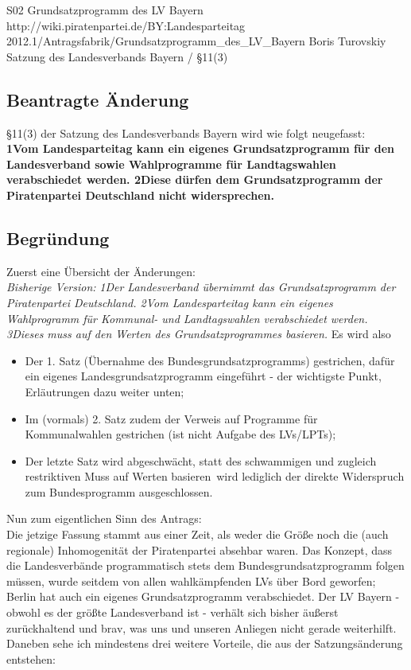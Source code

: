 \anderungsantrag
{S02}
{Grundsatzprogramm des LV Bayern}
{http://wiki.piratenpartei.de/BY:Landesparteitag 2012.1/Antragsfabrik/Grundsatzprogramm_des_LV_Bayern}
{Boris Turovskiy}
{Satzung des Landesverbands Bayern / §11(3)}
\subsection{Beantragte Änderung}
§11(3) der Satzung des Landesverbands Bayern wird wie folgt neugefasst:\\
\textbf{1Vom Landesparteitag kann ein eigenes Grundsatzprogramm für den Landesverband sowie
Wahlprogramme für Landtagswahlen verabschiedet werden. 2Diese dürfen dem
Grundsatzprogramm der Piratenpartei Deutschland nicht widersprechen.}
\subsection{Begründung}
Zuerst eine Übersicht der Änderungen:\\
\emph{Bisherige Version:}
\textit{
1Der Landesverband übernimmt das Grundsatzprogramm der Piratenpartei Deutschland. 2Vom
Landesparteitag kann ein eigenes Wahlprogramm für Kommunal- und Landtagswahlen
verabschiedet werden. 3Dieses muss auf den Werten des Grundsatzprogrammes basieren.}
Es wird also
\begin{itemize}
	\item Der 1. Satz (Übernahme des Bundesgrundsatzprogramms) gestrichen, dafür ein eigenes Landesgrundsatzprogramm eingeführt - der wichtigste Punkt, Erläutrungen dazu weiter unten;
	\item Im (vormals) 2. Satz zudem der Verweis auf Programme für Kommunalwahlen gestrichen (ist nicht Aufgabe des LVs/LPTs);
	\item Der letzte Satz wird abgeschwächt, statt des schwammigen und zugleich restriktiven \glqq Muss auf Werten basieren\grqq\  wird lediglich der direkte Widerspruch zum Bundesprogramm ausgeschlossen.
\end{itemize}
Nun zum eigentlichen Sinn des Antrags:\\

Die jetzige Fassung stammt aus einer Zeit, als weder die Größe noch die (auch regionale)
Inhomogenität der Piratenpartei absehbar waren. Das Konzept, dass die Landesverbände
programmatisch stets dem Bundesgrundsatzprogramm folgen müssen, wurde seitdem von allen
wahlkämpfenden LVs über Bord geworfen; Berlin hat auch ein eigenes Grundsatzprogramm
verabschiedet. Der LV Bayern - obwohl es der größte Landesverband ist - verhält sich bisher
äußerst zurückhaltend und brav, was uns und unseren Anliegen nicht gerade weiterhilft.
Daneben sehe ich mindestens drei weitere Vorteile, die aus der Satzungsänderung entstehen:
